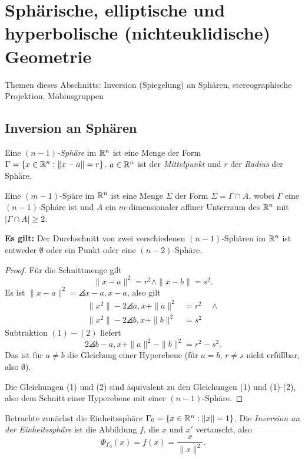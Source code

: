 \setcounter{secnumdepth}{1}
\section{Sphärische, elliptische und hyperbolische (nichteuklidische) Geometrie}
\setcounter{secnumdepth}{0}
Themen dieses Abschnitts: Inversion (Spiegelung) an Sphären, stereographische Projektion, Möbiusgruppen

\subsection{Inversion an Sphären}
\begin{defn*}
 Eine \emph{$(n-1)$-Sphäre} im $\mathbb{R}^n$ ist eine Menge der Form $\Gamma = \{ x \in \mathbb{R}^n : \| x - a \| = r \}$. $a \in \mathbb{R}^n$ ist der \emph{Mittelpunkt} und $r$ der \emph{Radius} der Sphäre.
 
 Eine $(m-1)$-Späre im $\mathbb{R}^n$ ist eine Menge $\Sigma$ der Form $\Sigma = \Gamma \cap A$, wobei $\Gamma$ eine $(n-1)$-Sphäre ist und $A$ ein $m$-dimensionaler affiner Unterraum des $\mathbb{R}^n$ mit $| \Gamma \cap A | \ge 2$.
\end{defn*}

\textbf{Es gilt:} Der Durchschnitt von zwei verschiedenen $(n-1)$-Sphären im $\mathbb{R}^n$ ist entweder $\emptyset$ oder ein Punkt oder eine $(n-2)$-Sphäre.

\begin{proof}
 Für die Schnittmenge gilt
 \[ \| x-a \|^2 = r^2 \wedge \| x-b \| = s^2. \]
 Es ist $\| x-a \|^2 = \angles{x-a,x-a}$, also gilt
 \begin{align*}
  \| x^2 \| - 2 \angles{a,x} + \| a \|^2 &= r^2 \quad \wedge  \tag{1} \\
  \| x^2 \| - 2 \angles{b,x} + \| b \|^2 &= s^2 \tag{2}
 \end{align*}
 Subtraktion $(1)-(2)$ liefert
 \[ 2 \angles{ b-a, x } + \| a \|^2 - \| b \|^2 = r^2 - s^2. \] 
 Das ist für $a \ne b$ die Gleichung einer Hyperebene (für $a=b$, $r \ne s$ nicht erfüllbar, also $\emptyset$).

 Die Gleichungen (1) und (2) sind äquivalent zu den Gleichungen (1) und (1)-(2), also dem Schnitt einer Hyperebene mit einer $(n-1)$-Sphäre.
\end{proof}

Betrachte zunächst die Einheitssphäre $\Gamma_0 = \{ x \in \mathbb{R}^n : \| x \| = 1 \}$. Die \emph{Inversion an der Einheitssphäre} ist die Abbildung $f$, die $x$ und $x'$ vertauscht, also
\[ \Phi_{\Gamma_0}(x) = f(x) = \frac{x}{\| x \|^2}. \]

